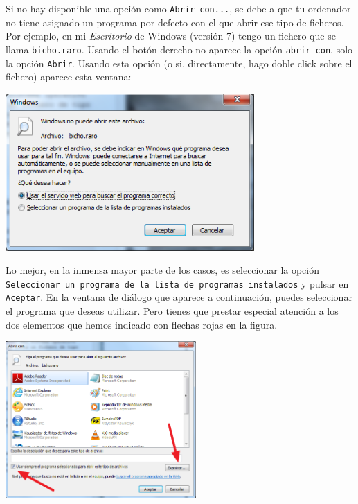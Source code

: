 \documentclass[10pt,a4paper]{article}
\newcounter {cont01}
\begin{document}
Si no hay disponible una opción como {\tt Abrir con...}, se debe a que tu ordenador no tiene
asignado un programa por defecto con el que abrir ese tipo de ficheros. Por ejemplo, en mi {\em
Escritorio} de Windows (versión 7) tengo un fichero que se llama {\tt bicho.raro}. Usando el botón
derecho no aparece la opción {\tt abrir con}, solo la opción {\tt Abrir}. Usando esta opción (o si,
directamente, hago doble click sobre el fichero) aparece esta ventana:
    \begin{center}
    \includegraphics[height=6cm]{../fig/Tut00-AbriendoBichoRaro.png}
    \end{center}
Lo mejor, en la inmensa mayor parte de los casos, es seleccionar la opción {\tt Seleccionar un
programa de la lista de programas instalados} y pulsar en {\tt Aceptar}. En la ventana de diálogo
que aparece a continuación, puedes seleccionar el programa que deseas utilizar. Pero tienes que
prestar especial atención a los dos elementos que hemos indicado con flechas rojas en la figura.

    \begin{center}
    \includegraphics[height=6cm]{../fig/Tut00-SeleccionandoProgramaPredeterminado.png}
    \end{center}
\end{document}
